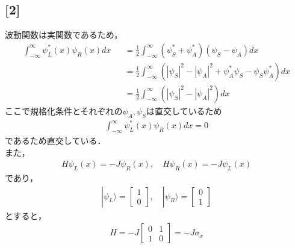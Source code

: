 \documentclass[12pt,dvipdfmx]{jsarticle}
\begin{document}
\subsection*{\large{[2]}}
波動関数は実関数であるため，
\begin{eqnarray}
  \int_{-\infty}^{\infty} \psi^{*}_L(x)\psi_R(x)dx &&= \frac{1}{2}\int_{-\infty}^{\infty} \left( \psi^{*}_S + \psi^{*}_A \right)\left( \psi_S - \psi_A \right)dx\\
  &&= \frac{1}{2}\int_{-\infty}^{\infty} \left( |\psi_S|^2 - |\psi_A|^2 + \psi_A^{*}\psi_S - \psi_S \psi_A^{*} \right)dx\\
  &&=  \frac{1}{2}\int_{-\infty}^{\infty} \left( |\psi_S|^2 - |\psi_A|^2 \right)dx
\end{eqnarray}
ここで規格化条件とそれぞれの$\psi_A,\psi_S$は直交しているため
\begin{eqnarray}
  \int_{-\infty}^{\infty} \psi^{*}_L(x)\psi_R(x)dx=0
\end{eqnarray}
であるため直交している．\\
また，
\begin{eqnarray}
  H \psi_L(x) = -J\psi_R(x),\quad H \psi_R(x) = -J\psi_L(x)
\end{eqnarray}
であり，
\begin{eqnarray}
  |\psi_L\rangle=
  \begin{bmatrix}
    1\\
    0
  \end{bmatrix},\quad
  |\psi_R\rangle=
  \begin{bmatrix}
    0\\
    1
  \end{bmatrix}
\end{eqnarray}
とすると，
\begin{eqnarray}
  H = -J
  \begin{bmatrix}
    0 & 1\\
    1 & 0
  \end{bmatrix}
  =-J\sigma_x
\end{eqnarray}
\end{document}
